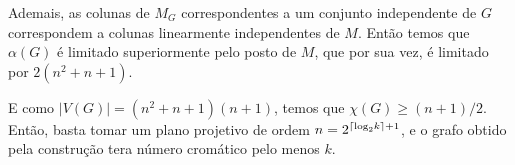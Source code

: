Ademais, as colunas de $M_G$ correspondentes a um conjunto independente de $G$ correspondem a colunas linearmente independentes de $M$. Então temos que $\alpha(G)$ é limitado superiormente pelo posto de $M$, que por sua vez, é limitado por $2(n^2+n+1)$.

E como $|V(G)| = (n^2+n+1)(n+1)$, temos que $\chi(G) \geq (n+1)/2$. Então, basta tomar um plano projetivo de ordem $n = 2^{\ceil*{\text{log}_2 k}+1}$, e o grafo obtido pela construção tera número cromático pelo menos $k$.











